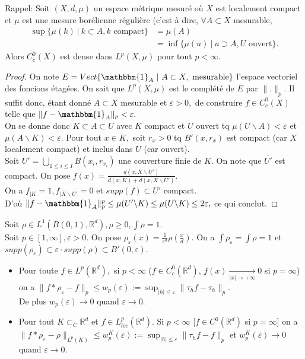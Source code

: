 \begin{remarque}
    Rappel: Soit $(X,d,\mu)$ un espace métrique mesuré où $X$ est localement compact et $\mu$ est une mesure borélienne régulière (c'est à dire, $\forall A\subset X$ mesurable, 
    \begin{align*}
        \sup \{\mu(k)\ |\ k\subset A, k \text{ compact}\} &=\mu(A)\\
        &=\inf \{\mu(u)\ |\ u\supset A, U \text{ ouvert}\}.
    \end{align*}
    Alors $C^0_c(X)$ est dense dans $L^p(X,\mu)$ pour tout $p<\infty .$
\end{remarque}
\begin{proof}
    On note $E=Vect \{\mathbbm{1}_A\ |\ A\subset X, \text{ mesurable}\} $ l'espace vectoriel des foncions étagées. On sait que $L^p(X,\mu)$ est le complété de $E$ par $\|.\|_p.$ Il suffit donc, étant donné $A\subset X$ mesurable et $\varepsilon >0,$ de construire $f\in C^0_c(X)$ telle que $\|f-\mathbbm{1}_A\|_p<\varepsilon .$ \\
    On se donne donc $K\subset A\subset U$ avec $K$ compact et $U$ ouvert tq $\mu(U \backslash A)<\varepsilon $ et $\mu(A \backslash K)<\varepsilon .$ Pour tout $x\in K,$ soit $r_x>0$ tq $B'(x,r_x)$ est compact (car $X$ localement compact) et inclus dans $U$ (car ouvert). \\
    Soit $U'=\bigcup\limits_{1\le i\le I} B(x_i,r_{x_i})$ une couverture finie de $K.$ On note que $\overline{U'}$ est compact. On pose $f(x)=\frac{d(x,X \backslash U')}{d(x,K)+d(x, X \backslash U')}.$ \\
On a $f_{|K}=1,f_{|X \backslash U'}=0$ et $supp(f)\subset \overline{U'}$ compact.\\
D'où $\|f-\mathbbm{1}_A\|_p^p\le \mu(U' \backslash K)\le \mu(U \backslash K)\le 2\varepsilon , $ ce qui conclut.
\end{proof}
\begin{propriete}
    Soit $\rho\in L^1(B(0,1), \mathbb{R} ^d), \rho\ge 0,\int \rho=1$.\\
    Soit $p\in [1,\infty ], \varepsilon >0$. On pose $\rho_\varepsilon (x)=\frac{1}{\varepsilon ^d}\rho(\frac{x}{d}).$ On a $\int \rho_\varepsilon =\int \rho=1$ et $supp(\rho_\varepsilon )\subset \varepsilon\cdot supp(\rho)\subset B'(0,\varepsilon ).$
    \begin{itemize}
        \item Pour toute $f\in L^p(\mathbb{R} ^d),$ si $p<\infty $ ($f\in C^0_c(\mathbb{R} ^d)$, $f(x)\underset{|x| \to +\infty}{\longrightarrow} 0$ si $p=\infty $) on a $\|f*\rho_\varepsilon -f\|_p\le w_p(\varepsilon) :=\sup_{|h| \le \varepsilon }\|\tau_hf-\tau_h\|_p$. \\
        De plus $w_p(\varepsilon )\to 0$ quand $\varepsilon \to 0.$
        \item Pour tout $K\subset _C\mathbb{R} ^d$ et $f\in L^p_{loc}(\mathbb{R} ^d).$ Si $p<\infty $ [$f\in C^0(\mathbb{R} ^d)$ si $p=\infty $] on a $\|f*\rho_\varepsilon -\rho\|_{L^p(K)}\le w_p^K(\varepsilon ):=\sup_{|h| \le \varepsilon }\|\tau_hf-f\|_p$ et $w_p^K(\varepsilon )\to 0$ quand $\varepsilon \to 0.$
    \end{itemize}
\end{propriete}

